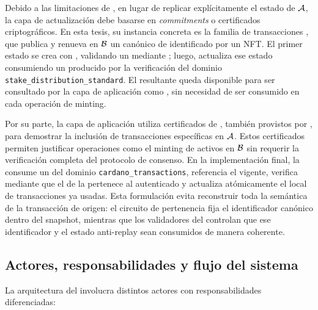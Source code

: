 Debido a las limitaciones de \Cardano, en lugar de replicar explícitamente el estado de $\mathcal{A}$, la capa de actualización debe basarse en \textit{commitments} o certificados criptográficos. En esta tesis, su instancia concreta es la familia de transacciones \StakeDistTx, que publica y renueva en $\mathcal{B}$ un \UTxO canónico de \StakeDistribution identificado por un NFT. El primer estado se crea con \StakeDistributionGenesisTxTemplate, validando un \GenesisCertificate mediante \GenesisVerificationKey; luego, \StakeDistributionStandardTxTemplate actualiza ese estado consumiendo un \ProofReceipt producido por la verificación \STM del dominio \texttt{stake\_distribution\_standard}. El \UTxO resultante queda disponible para ser consultado por la capa de aplicación como \ReferenceInput, sin necesidad de ser consumido en cada operación de minting.

Por su parte, la capa de aplicación utiliza certificados de \emph{\TransactionSnapshot}, también provistos por \Mithril, para demostrar la inclusión de transacciones específicas en $\mathcal{A}$. Estos certificados permiten justificar operaciones como el minting de activos en $\mathcal{B}$ sin requerir la verificación completa del protocolo de consenso. En la implementación final, la \MintTx consume un \ProofReceipt del dominio \texttt{cardano\_transactions}, referencia el \StakeDistributionUTxO vigente, verifica mediante \Groth que el \TxId de la \LockTx pertenece al \TransactionSnapshot autenticado y actualiza atómicamente el \SMT local de transacciones ya usadas. Esta formulación evita reconstruir \Onchain toda la semántica de la transacción de origen: el circuito de pertenencia fija el identificador canónico dentro del snapshot, mientras que los validadores del \Bridge controlan que ese identificador y el estado anti-replay sean consumidos de manera coherente.

\subsection{Actores, responsabilidades y flujo del sistema}
\label{subsec:design-decisions-actores-responsabilidades-y-flujo-del-sistema}

La arquitectura del \Bridge involucra distintos actores con responsabilidades diferenciadas:

